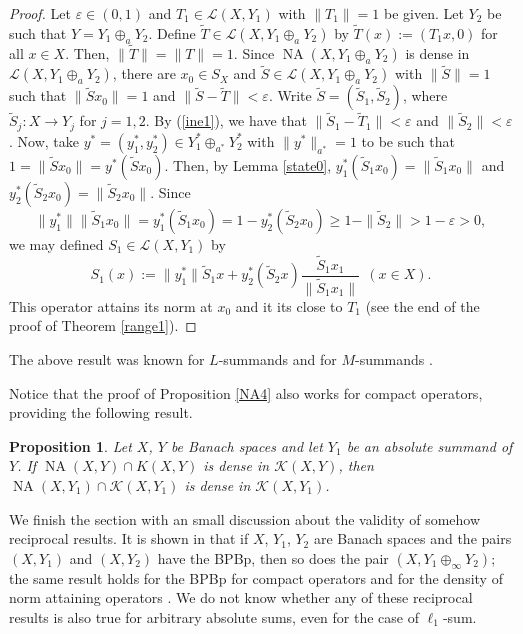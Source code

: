 \documentclass[10pt,a4paper]{amsart}
\theoremstyle{plain}
\newtheorem{prop}[theorem]{Proposition}
\theoremstyle{definition}
\newcommand{\eps}{\varepsilon}
\DeclareMathOperator{\NA}{NA}
\renewcommand{\geq}{\geqslant}
\begin{document}
\begin{proof} Let $\eps \in (0, 1)$ and $T_1 \in \mathcal{L}(X, Y_1)$ with $\|T_1\| = 1$ be given. Let $Y_2$ be such that $Y = Y_1 \oplus_a Y_2$. Define $\widetilde{T} \in \mathcal{L}(X, Y_1 \oplus_a Y_2)$ by $\widetilde{T}(x) := (T_1x, 0)$ for all $x \in X$. Then, $\|\widetilde{T}\| = \|T\| = 1$. Since $\NA(X, Y_1 \oplus_a Y_2)$ is dense in $\mathcal{L}(X, Y_1 \oplus_a Y_2)$, there are $x_0 \in S_X$ and $\widetilde{S} \in \mathcal{L}(X, Y_1 \oplus_a Y_2)$ with $\|\widetilde{S}\| = 1$ such that $\|\widetilde{S}x_0\| = 1$ and $\|\widetilde{S} - \widetilde{T}\| < \eps$. Write $\widetilde{S} = (\widetilde{S}_1, \widetilde{S}_2)$, where $\widetilde{S}_j: X \longrightarrow Y_j$ for $j = 1, 2$. By (\ref{ine1}), we have that $\|\widetilde{S}_1 - \widetilde{T}_1\| < \eps$ and $\|\widetilde{S}_2\| < \eps$. Now, take $y^* = (y_1^*, y_2^*) \in Y_1^* \oplus_{a^*} Y_2^*$ with $\|y^*\|_{a^*} = 1$ to be such that $1 = \|\widetilde{S}x_0\| = y^*(\widetilde{S}x_0)$. Then, by Lemma \ref{state0}, $y_1^*(\widetilde{S}_1x_0) = \|\widetilde{S}_1x_0\|$ and $y_2^*(\widetilde{S}_2x_0) = \|\widetilde{S}_2x_0\|$. Since
	\begin{equation*}
	\|y_1^*\| \|\widetilde{S}_1x_0\| = y_1^*(\widetilde{S}_1x_0) = 1 - y_2^*(\widetilde{S}_2x_0) \geq 1 - \|\widetilde{S}_2\| > 1 - \eps > 0,
	\end{equation*}
	we may defined $S_1 \in \mathcal{L}(X, Y_1)$ by
	\begin{equation*}
	S_1(x) := \|y_1^*\| \widetilde{S}_1x + y_2^* (\widetilde{S}_2x) \frac{\widetilde{S}_1x_1}{\|\widetilde{S}_1x_1\|} \ \ (x  \in X).
	\end{equation*}
	This operator attains its norm at $x_0$ and it its close to $T_1$ (see the end of the proof of Theorem \ref{range1}).
\end{proof}

The above result was known for $L$-summands \cite[Proposition 2.9]{ACKLM} and for $M$-summands \cite[Lemma 2]{PS}.

Notice that the proof of Proposition \ref{NA4} also works for compact operators, providing the following result.

\begin{prop} \label{NA5} Let $X$, $Y$ be Banach spaces and let $Y_1$ be an absolute summand of $Y$. If $\NA(X, Y) \cap K(X, Y)$ is dense in $\mathcal{K}(X, Y)$, then $\NA(X, Y_1) \cap \mathcal{K}(X, Y_1)$ is dense in $\mathcal{K}(X, Y_1)$.	
\end{prop}

We finish the section with an small discussion about the validity of somehow  reciprocal results. It is shown in \cite[Proposition 2.4]{ACKLM} that if $X$, $Y_1$, $Y_2$ are Banach spaces and the pairs $(X,Y_1)$ and $(X,Y_2)$ have the BPBp, then so does the pair $(X,Y_1\oplus_\infty Y_2)$; the same result holds for the BPBp for compact operators \cite[Lemma 3.16]{DGMM} and for the density of norm attaining operators \cite[Lemma 2]{PS}. We do not know whether any of these reciprocal results is also true for arbitrary absolute sums, even for the case of $\ell_1$-sum.
\end{document}

